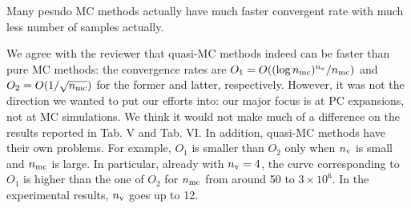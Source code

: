 \begin{reviewer}
Many pesudo MC methods actually have much faster convergent rate with much less number of samples actually.
\end{reviewer}
\begin{authors}
We agree with the reviewer that quasi-MC methods indeed can be faster than pure MC methods: the convergence rates are $O_1 = O((\log{n_\text{mc}})^{n_\text{v}} / {n_\text{mc}})$ and $O_2 = O(1 / \sqrt{{n_\text{mc}}})$ for the former and latter, respectively.
However, it was not the direction we wanted to put our efforts into: our major focus is at PC expansions, not at MC simulations.
We think it would not make much of a difference on the results reported in Tab. V and Tab. VI.
In addition, quasi-MC methods have their own problems.
For example, $O_1$ is smaller than $O_2$ only when ${n_\text{v}}$ is small and ${n_\text{mc}}$ is large.
In particular, already with ${n_\text{v}} = 4$, the curve corresponding to $O_1$ is higher than the one of $O_2$ for ${n_\text{mc}}$ from around 50 to $3 \times 10^6$.
In the experimental results, ${n_\text{v}}$ goes up to 12.
\end{authors}

